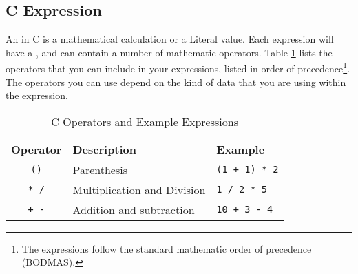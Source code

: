\clearpage
\subsection{C Expression} %
\label{sub:program-creation-c_expression}

An  in C is a mathematical calculation or a Literal value. Each expression will have a , and can contain a number of mathematic operators. Table \ref{tbl:program-creation-c operators and expresions} lists the operators that you can include in your expressions, listed in order of precedence\footnote{The expressions follow the standard mathematic order of precedence (BODMAS).}. The operators you can use depend on the kind of data that you are using within the expression.

\begin{table}[h]
  \centering
  \begin{tabular}{|c|l|l|}
    \hline
    \textbf{Operator} & \textbf{Description} & \textbf{Example} \\
    \hline
    \texttt{ () }     &   Parenthesis                 & \texttt{(1 + 1) * 2}  \\
    \texttt{* /}      &   Multiplication and Division & \texttt{1 / 2 * 5}    \\
    \texttt{+ -}      &   Addition and subtraction    & \texttt{10 + 3 - 4}   \\
    \hline
  \end{tabular}
  \caption{C Operators and Example Expressions}
  \label{tbl:program-creation-c operators and expresions}
\end{table}


